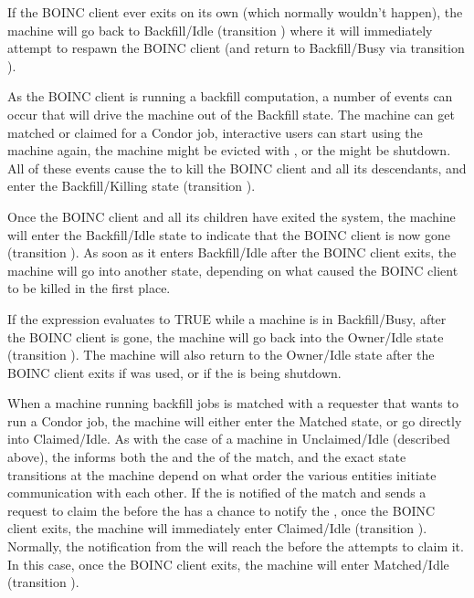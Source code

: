 If the BOINC client ever exits on its own (which normally wouldn't
happen), the machine will go back to Backfill/Idle (transition
) where it will immediately attempt to respawn the BOINC
client (and return to Backfill/Busy via transition ).

As the BOINC client is running a backfill computation, a number of
events can occur that will drive the machine out of the Backfill
state.
The machine can get matched or claimed for a Condor job, interactive
users can start using the machine again, the machine might be evicted
with , or the  might be shutdown.
All of these events cause the  to kill the BOINC client
and all its descendants, and enter the Backfill/Killing state
(transition ).

Once the BOINC client and all its children have exited the system, the
machine will enter the Backfill/Idle state to indicate that the BOINC
client is now gone (transition ).
As soon as it enters Backfill/Idle after the BOINC client exits, the
machine will go into another state, depending on what caused the BOINC
client to be killed in the first place.

If the  expression evaluates to TRUE while a
machine is in Backfill/Busy, after the BOINC client is gone, the
machine will go back into the Owner/Idle state (transition
).
The machine will also return to the Owner/Idle state after the BOINC
client exits if  was used, or if the  is
being shutdown.

When a machine running backfill jobs is matched with a requester that
wants to run a Condor job, the machine will either enter the Matched
state, or go directly into Claimed/Idle.
As with the case of a machine in Unclaimed/Idle (described above), the
 informs both the  and the
 of the match, and the exact state transitions at the
machine depend on what order the various entities initiate
communication with each other.
If the  is notified of the match and sends a request to
claim the  before the  has a chance
to notify the , once the BOINC client exits, the
machine will immediately enter Claimed/Idle (transition ).
Normally, the notification from the  will reach the
 before the  attempts to claim it.
In this case, once the BOINC client exits, the machine will enter
Matched/Idle (transition ).


